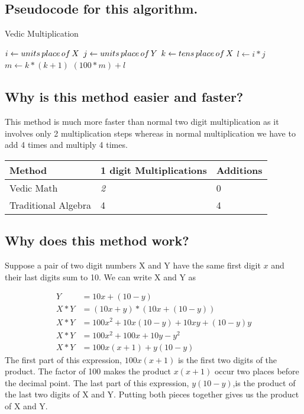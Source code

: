 \documentclass{article}
\begin{document}
\subsection{Pseudocode for this algorithm.}
\label{subsec2}
\begin{algorithm}
   \caption{Vedic Multiplication}
    \begin{algorithmic}[h]

        \State $i \gets units \thinspace place \thinspace of \thinspace X $
        \State $j \gets units \thinspace place \thinspace of \thinspace Y $
        \State $k \gets tens \thinspace place \thinspace of \thinspace X $
        \State $l \gets i*j$
        \State $m \gets k*(k+1)$
        \newline
        \Return $(100*m)+l$
       \EndFunction
\end{algorithmic}
\end{algorithm}

\subsection{Why is this method easier and faster?}
\label{subsec3}
This method is much more faster than normal two digit multiplication as it involves only 2 multiplication steps whereas in normal multiplication we have to add 4 times and multiply 4 times.
\newline

\begin{center}
{\begin{tabular}{| p{3cm} | p{4cm} | p{4cm} |}
\hline
Method & 1 digit Multiplications & Additions \\
\hline
Vedic Math  & \textit{2}  & 0  \\

\hline

Traditional Algebra          &  4         & 4   \\

\hline
\end{tabular}
}
\end{center}


\subsection{Why does this method work?}
\label{subsec4}
Suppose a pair of two digit numbers X and Y have the same first digit $x$ and their last digits sum to 10. We can write X and Y as

\begin{align}
    Y&=10x+(10-y) \\
    X*Y&=(10x+y)*(10x+(10-y)) \\
    X*Y&=100x^2+10x(10-y)+10xy+(10-y)y \\
    X*Y&=100x^2+100x+10y-y^2 \\
    X*Y&=100x(x+1)+y(10-y)
\end{align}
The first part of this expression, $100x(x+1)$ is the first two digits of the product. The factor of 100 makes the product $x(x+1)$ occur two places before the decimal point. The last part of this expression, $y(10-y)$,is the product of the last two digits of X and Y. Putting both pieces together gives us the product of X and Y.
\end{document}
